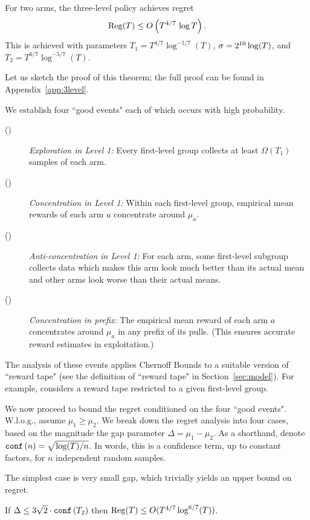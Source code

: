 \begin{theorem}
\label{thm:3level}
For two arms, the three-level policy
achieves regret
\[ \mathrm{Reg}(T) \leq O\left( T^{4/7}\, \log T \right).\]
This is achieved with parameters
    $T_1 = T^{4/7}\log^{-1/7}(T)$,
    $\sigma = 2^{10}\log(T)$, and
    $T_2 = T^{6/7}\log^{-5/7}(T)$.
\end{theorem}

Let us sketch the proof of this theorem; the full proof can be found in Appendix~\ref{app:3level}.

We establish four ``good events" each of which occurs with high probability.
\begin{description}
\item[()] \emph{Exploration in Level 1:} Every first-level group collects at least $\Omega(T_1)$ samples of each arm.
\item[()] \emph{Concentration in Level 1:} Within each first-level group, empirical mean rewards of each arm $a$ concentrate around $\mu_a$.
\item[()] \emph{Anti-concentration in Level 1:} For each arm, some first-level subgroup collects data which makes this arm look much better than its actual mean and other arms look worse than their actual means.
\item[()] \emph{Concentration in prefix:}
The empirical mean reward of each arm $a$ concentrates around $\mu_a$ in any prefix of its pulls. (This ensures accurate reward estimates in exploitation.)
\end{description}

The analysis of these events applies Chernoff Bounds to a suitable version of ``reward tape" (see the definition of ``reward tape" in Section~\ref{sec:model}). For example,  considers a reward tape restricted to a given first-level group.

We now proceed to bound the regret conditioned on the four ``good events". W.l.o.g., assume $\mu_1 \geq \mu_2$. We break down the regret analysis into four cases, based on the magnitude the gap parameter $\Delta = \mu_1-\mu_2$. As a shorthand, denote
    $\mathtt{conf}\left(n\right) = \sqrt{\log(T)/n}$.
In words, this is a confidence term, up to constant factors, for $n$ independent random samples.

The simplest case is very small gap, which trivially yields an upper bound on regret.

\begin{claim}
If
    $\Delta \leq 3\sqrt{2}\cdot  \mathtt{conf}\left(T_2\right)$
then
  $\mathrm{Reg}(T)\leq O(T^{4/7} \log^{6/7}(T))$.
\end{claim}

